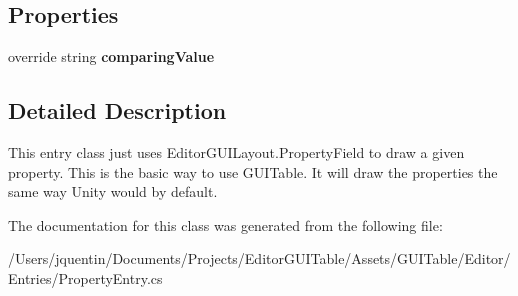 \subsection*{Properties}
\begin{DoxyCompactItemize}
\item 
\mbox{\label{class_g_u_i_extensions_1_1_property_entry_a40ce6bba52176b88be69536e4a0c4258}} 
override string {\bfseries comparing\+Value}
\end{DoxyCompactItemize}


\subsection{Detailed Description}
This entry class just uses Editor\+G\+U\+I\+Layout.\+Property\+Field to draw a given property. This is the basic way to use G\+U\+I\+Table. It will draw the properties the same way Unity would by default. 



The documentation for this class was generated from the following file\+:\begin{DoxyCompactItemize}
\item 
/\+Users/jquentin/\+Documents/\+Projects/\+Editor\+G\+U\+I\+Table/\+Assets/\+G\+U\+I\+Table/\+Editor/\+Entries/Property\+Entry.\+cs\end{DoxyCompactItemize}
